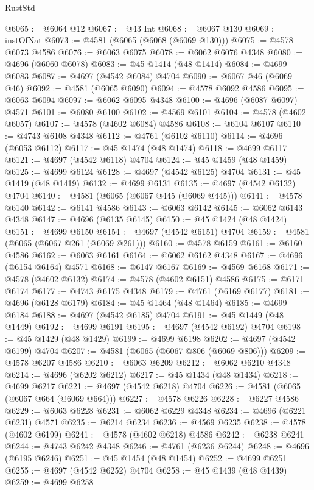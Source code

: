 \begin{lexlean}{RustStd}
\begin{coremodule}
@6065 := @6064 @12
@6067 := @43 Int
@6068 := @6067 @130
@6069 := instOfNat
@6073 := @4581 (@6065 (@6068 (@6069 @130)))
@6075 := @4578 @6073 @4586
@6076 := @6063 @6075
@6078 := @6062 @6076 @4348
@6080 := @4696 (@6060 @6078)
@6083 := @45 @1414 (@48 @1414)
@6084 := @4699 @6083
@6087 := @4697 (@4542 @6084) @4704
@6090 := @6067 @46 (@6069 @46)
@6092 := @4581 (@6065 @6090)
@6094 := @4578 @6092 @4586
@6095 := @6063 @6094
@6097 := @6062 @6095 @4348
@6100 := @4696 (@6087 @6097) @4571
@6101 := @6080 @6100
@6102 := @4569 @6101
@6104 := @4578 (@4602 @6057)
@6107 := @4578 (@4602 @6084) @4586
@6108 := @6104 @6107
@6110 := @4743 @6108 @4348
@6112 := @4761 (@6102 @6110)
@6114 := @4696 (@6053 @6112)
@6117 := @45 @1474 (@48 @1474)
@6118 := @4699 @6117
@6121 := @4697 (@4542 @6118) @4704
@6124 := @45 @1459 (@48 @1459)
@6125 := @4699 @6124
@6128 := @4697 (@4542 @6125) @4704
@6131 := @45 @1419 (@48 @1419)
@6132 := @4699 @6131
@6135 := @4697 (@4542 @6132) @4704
@6140 := @4581 (@6065 (@6067 @445 (@6069 @445)))
@6141 := @4578 @6140
@6142 := @6141 @4586
@6143 := @6063 @6142
@6145 := @6062 @6143 @4348
@6147 := @4696 (@6135 @6145)
@6150 := @45 @1424 (@48 @1424)
@6151 := @4699 @6150
@6154 := @4697 (@4542 @6151) @4704
@6159 := @4581 (@6065 (@6067 @261 (@6069 @261)))
@6160 := @4578 @6159
@6161 := @6160 @4586
@6162 := @6063 @6161
@6164 := @6062 @6162 @4348
@6167 := @4696 (@6154 @6164) @4571
@6168 := @6147 @6167
@6169 := @4569 @6168
@6171 := @4578 (@4602 @6132)
@6174 := @4578 (@4602 @6151) @4586
@6175 := @6171 @6174
@6177 := @4743 @6175 @4348
@6179 := @4761 (@6169 @6177)
@6181 := @4696 (@6128 @6179)
@6184 := @45 @1464 (@48 @1464)
@6185 := @4699 @6184
@6188 := @4697 (@4542 @6185) @4704
@6191 := @45 @1449 (@48 @1449)
@6192 := @4699 @6191
@6195 := @4697 (@4542 @6192) @4704
@6198 := @45 @1429 (@48 @1429)
@6199 := @4699 @6198
@6202 := @4697 (@4542 @6199) @4704
@6207 := @4581 (@6065 (@6067 @806 (@6069 @806)))
@6209 := @4578 @6207 @4586
@6210 := @6063 @6209
@6212 := @6062 @6210 @4348
@6214 := @4696 (@6202 @6212)
@6217 := @45 @1434 (@48 @1434)
@6218 := @4699 @6217
@6221 := @4697 (@4542 @6218) @4704
@6226 := @4581 (@6065 (@6067 @664 (@6069 @664)))
@6227 := @4578 @6226
@6228 := @6227 @4586
@6229 := @6063 @6228
@6231 := @6062 @6229 @4348
@6234 := @4696 (@6221 @6231) @4571
@6235 := @6214 @6234
@6236 := @4569 @6235
@6238 := @4578 (@4602 @6199)
@6241 := @4578 (@4602 @6218) @4586
@6242 := @6238 @6241
@6244 := @4743 @6242 @4348
@6246 := @4761 (@6236 @6244)
@6248 := @4696 (@6195 @6246)
@6251 := @45 @1454 (@48 @1454)
@6252 := @4699 @6251
@6255 := @4697 (@4542 @6252) @4704
@6258 := @45 @1439 (@48 @1439)
@6259 := @4699 @6258

\end{coremodule}
\end{lexlean}
